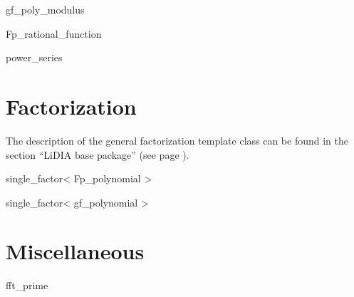 \begin{class}{gf_poly_modulus}
  
\end{class}

\begin{class}{Fp_rational_function}
  
\end{class}

\begin{class}{power_series}
  
\end{class}


\chapter{Factorization}

The description of the general factorization template class can be found in the section ``LiDIA
base package'' (see page \pageref{LiDIA-base:factorization}).

\begin{class}{single_factor< Fp_polynomial >}
  
\end{class}

\begin{class}{single_factor< gf_polynomial >}
  
\end{class}


\chapter{Miscellaneous}

\begin{class}{fft_prime}
  
\end{class}
